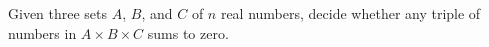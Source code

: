 \begin{problem}
	Given three sets \(A\), \(B\), and \(C\) of
	\(n\) real numbers, decide
	whether any triple of numbers in \(A \times B \times C\) sums to zero.
\end{problem}
